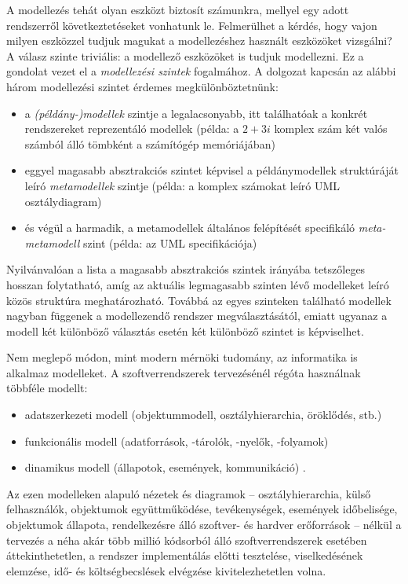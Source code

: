 A modellezés tehát olyan eszközt biztosít számunkra, mellyel egy adott rendszerről következtetéseket vonhatunk le.
Felmerülhet a kérdés, hogy vajon milyen eszközzel tudjuk magukat a modellezéshez használt eszközöket vizsgálni?
A válasz szinte triviális: a modellező eszközöket is tudjuk modellezni.
Ez a gondolat vezet el a \emph{modellezési szintek} fogalmához.
A dolgozat kapcsán az alábbi három modellezési szintet érdemes megkülönböztetnünk:
\begin{itemize}
    \item a \emph{(példány-)modellek} szintje a legalacsonyabb, itt találhatóak a konkrét rendszereket reprezentáló modellek (példa: a $2 + 3i$ komplex szám két valós számból álló tömbként a számítógép memóriájában)
    \item eggyel magasabb absztrakciós szintet képvisel a példánymodellek struktúráját leíró \emph{metamodellek} szintje (példa: a komplex számokat leíró \gls{UML} osztálydiagram)
    \item és végül a harmadik, a metamodellek általános felépítését specifikáló \emph{meta-metamodell} szint (példa: az \gls{UML} specifikációja)
\end{itemize}
Nyilvánvalóan a lista a magasabb absztrakciós szintek irányába tetszőleges hosszan folytatható, amíg az aktuális legmagasabb szinten lévő modelleket leíró közös struktúra meghatározható.
Továbbá az egyes szinteken található modellek nagyban függenek a modellezendő rendszer megválasztásától, emiatt ugyanaz a modell két különböző választás esetén két különböző szintet is képviselhet.

Nem meglepő módon, mint modern mérnöki tudomány, az informatika is alkalmaz modelleket.
A szoftverrendszerek tervezésénél régóta használnak többféle modellt:
\begin{itemize}
	\item adatszerkezeti modell (objektummodell, osztályhierarchia, öröklődés, stb.)
	\item funkcionális modell (adatforrások, -tárolók, -nyelők, -folyamok)
	\item dinamikus modell (állapotok, események, kommunikáció) \cite{Kondorosi07}.
\end{itemize}
Az ezen modelleken alapuló nézetek és diagramok -- osztályhierarchia, külső felhasználók, objektumok együttműködése, tevékenységek, események időbelisége, objektumok állapota, rendelkezésre álló szoftver- és hardver erőforrások -- nélkül a tervezés a néha akár több millió kódsorból álló szoftverrendszerek esetében áttekinthetetlen, a rendszer implementálás előtti tesztelése, viselkedésének elemzése, idő- és költségbecslések elvégzése kivitelezhetetlen volna.

